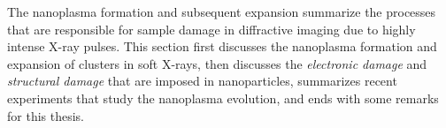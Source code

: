 %
The nanoplasma formation and subsequent expansion summarize the processes that are responsible for sample damage in diffractive imaging due to highly intense X-ray pulses. This section first discusses the nanoplasma formation and expansion of clusters in soft X-rays, then discusses the \textit{electronic damage} and \textit{structural damage} that are imposed in nanoparticles, summarizes recent experiments that study the nanoplasma evolution, and ends with some remarks for this thesis.\\[1\baselineskip]
%
